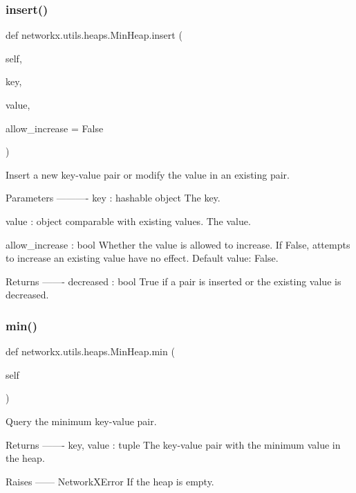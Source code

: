 \subsubsection{\texorpdfstring{insert()}{insert()}}
{\footnotesize\ttfamily def networkx.\+utils.\+heaps.\+Min\+Heap.\+insert (\begin{DoxyParamCaption}\item[{}]{self,  }\item[{}]{key,  }\item[{}]{value,  }\item[{}]{allow\+\_\+increase = {\ttfamily False} }\end{DoxyParamCaption})}

\begin{DoxyVerb}Insert a new key-value pair or modify the value in an existing
pair.

Parameters
----------
key : hashable object
    The key.

value : object comparable with existing values.
    The value.

allow_increase : bool
    Whether the value is allowed to increase. If False, attempts to
    increase an existing value have no effect. Default value: False.

Returns
-------
decreased : bool
    True if a pair is inserted or the existing value is decreased.
\end{DoxyVerb}
 \mbox{\label{classnetworkx_1_1utils_1_1heaps_1_1MinHeap_a9544b6eaa60f41932c0c65b7647d6c7f}} 
\subsubsection{\texorpdfstring{min()}{min()}}
{\footnotesize\ttfamily def networkx.\+utils.\+heaps.\+Min\+Heap.\+min (\begin{DoxyParamCaption}\item[{}]{self }\end{DoxyParamCaption})}

\begin{DoxyVerb}Query the minimum key-value pair.

Returns
-------
key, value : tuple
    The key-value pair with the minimum value in the heap.

Raises
------
NetworkXError
    If the heap is empty.
\end{DoxyVerb}
 \mbox{\label{classnetworkx_1_1utils_1_1heaps_1_1MinHeap_ac409c9d8f48dc8f4b6f157372b50bc64}} 
